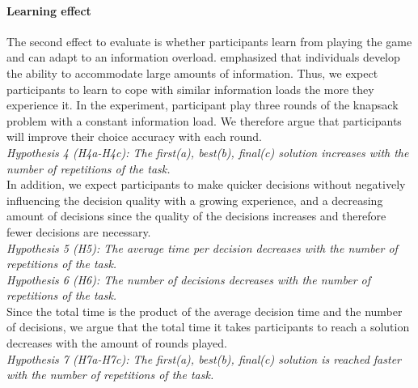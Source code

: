 \paragraph{Learning effect}
The second effect to evaluate is whether participants learn from playing the game and can adapt to an information overload. \cite{Jacoby1974} emphasized that individuals develop the ability to accommodate large amounts of information. Thus, we expect participants to learn to cope with similar information loads the more they experience it. In the experiment, participant play three rounds of the knapsack problem with a constant information load. We therefore argue that participants will improve their choice accuracy with each round.\\
\textit{Hypothesis 4 (H4a-H4c): The first(a), best(b), final(c) solution increases with the number of repetitions of the task. }\\
In addition, we expect participants to make quicker decisions without negatively influencing the decision quality with a growing experience, and a decreasing amount of decisions since the quality of the decisions increases and therefore fewer decisions are necessary. \\
\textit{Hypothesis 5 (H5): The average time per decision decreases with the number of repetitions of the task. }\\
\textit{Hypothesis 6 (H6): The number of decisions decreases with the number of repetitions of the task. }\\
Since the total time is the product of the average decision time and the number of decisions, we argue that the total time it takes participants to reach a solution decreases with the amount of rounds played.\\
\textit{Hypothesis 7 (H7a-H7c): The first(a), best(b), final(c) solution is reached faster with the number of repetitions of the task. }

